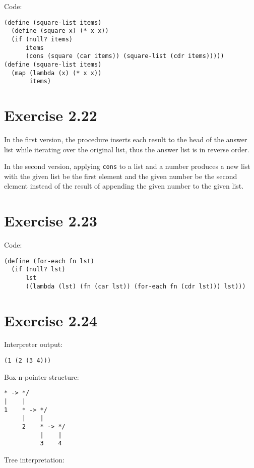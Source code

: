 \documentclass[../main.tex]{subfiles}
\begin{document}
Code:

\begin{lstlisting}
(define (square-list items)
  (define (square x) (* x x))
  (if (null? items)
      items
      (cons (square (car items)) (square-list (cdr items)))))
(define (square-list items)
  (map (lambda (x) (* x x))
       items)
\end{lstlisting}

\section{Exercise 2.22}

In the first version, the procedure inserts
 each result to the head of the answer list
 while iterating over the original list, thus
 the answer list is in reverse order.

In the second version, applying \lstinline{cons}
 to a list and a number produces a new list with
 the given list be the first element and the given
 number be the second element instead of the result
 of appending the given number to the given list.

\section{Exercise 2.23}

Code:

\begin{lstlisting}
(define (for-each fn lst)
  (if (null? lst)
      lst
      ((lambda (lst) (fn (car lst)) (for-each fn (cdr lst))) lst)))
\end{lstlisting}

\section{Exercise 2.24}

Interpreter output:

\begin{lstlisting}
(1 (2 (3 4)))
\end{lstlisting}

Box-n-pointer structure:

\begin{lstlisting}
* -> */
|    |
1    * -> */
     |    |
     2    * -> */
          |    |
          3    4
\end{lstlisting}

Tree interpretation:

\vspace{2mm}
\end{document}
